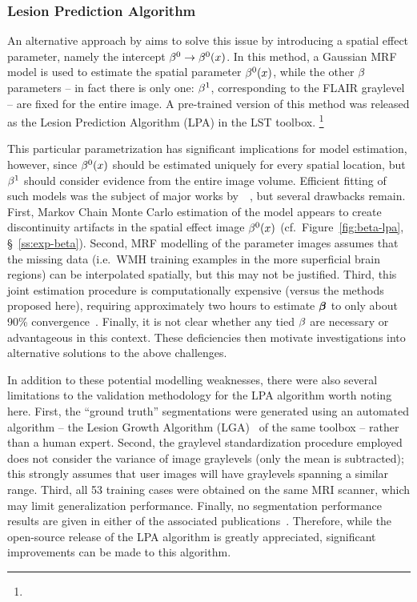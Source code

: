 \subsubsection{Lesion Prediction Algorithm}\label{sss:limits-lpa}
An alternative approach by \citeauthor{Schmidt2017a} aims to solve this issue
by introducing a spatial effect parameter, namely the intercept $\beta^0 \rightarrow \beta^0(x)$.
In this method, a Gaussian MRF model is used to estimate the spatial parameter $\beta^0(x)$,
while the other $\beta$ parameters
-- in fact there is only one: $\beta^1$, corresponding to the FLAIR graylevel --
are fixed for the entire image.
A pre-trained version of this method was released as
the Lesion Prediction Algorithm (LPA) in the LST toolbox.%
\footnote{}
\par
This particular parametrization has significant implications for model estimation, however,
since $\beta^0(x)$ should be estimated uniquely for every spatial location,
but $\beta^1$ should consider evidence from the entire image volume.
Efficient fitting of such models was the subject of major works
by~\citeauthor{Schmidt2017}~\cite{Schmidt2017,Schmidt2017a}, but several drawbacks remain.
First, Markov Chain Monte Carlo estimation of the model
appears to create discontinuity artifacts in the spatial effect image $\beta^0(x)$
(cf.~Figure~\ref{fig:beta-lpa}, \S~\ref{ss:exp-beta}).
Second, MRF modelling of the parameter images assumes that the missing data
(i.e.\ WMH training examples in the more superficial brain regions)
can be interpolated spatially, but this may not be justified.
Third, this joint estimation procedure is computationally expensive
(versus the methods proposed here),
requiring approximately two hours to estimate $\bm{\beta}$
to only about 90\% convergence~\cite{Schmidt2017a}.
Finally, it is not clear whether any tied $\beta$ are necessary or advantageous in this context.
These deficiencies then motivate investigations into alternative solutions to the above challenges.
\par
In addition to these potential modelling weaknesses, there were also several limitations
to the validation methodology for the LPA algorithm worth noting here.
First, the ``ground truth'' segmentations were generated using an automated algorithm
-- the Lesion Growth Algorithm (LGA)~\cite{Schmidt2012} of the same toolbox --
rather than a human expert.
Second, the graylevel standardization procedure employed does not consider
the variance of image graylevels (only the mean is subtracted);
this strongly assumes that user images will have graylevels spanning a similar range.
Third, all 53 training cases were obtained on the same MRI scanner,
which may limit generalization performance.
Finally, no segmentation performance results
are given in either of the associated publications~\cite{Schmidt2017,Schmidt2017a}.
Therefore, while the open-source release of the LPA algorithm is greatly appreciated,
significant improvements can be made to this algorithm.
